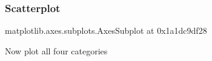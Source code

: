 \documentclass[letterpaper,10pt,english]{sphinxmanual}
\begin{document}
\subsubsection{Scatterplot}
\label{\detokenize{content/Introduction_to_Plotting:id1}}
\begin{sphinxVerbatim}[commandchars=\\\{\}]
\PYG{p}{[}\PYG{p}{[} \PYG{p}{]}\PYG{p}{]}  
\end{sphinxVerbatim}

\begin{sphinxVerbatim}[commandchars=\\\{\}]
\PYGZlt{}matplotlib.axes.\PYGZus{}subplots.AxesSubplot at 0x1a1dc9df28\PYGZgt{}
\end{sphinxVerbatim}

\noindent{}

Now plot all four categories
\end{document}
